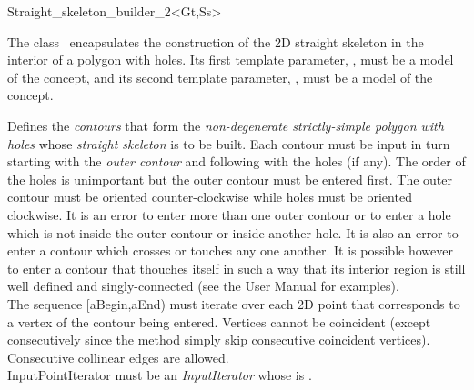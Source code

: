 

\begin{ccRefClass}{Straight_skeleton_builder_2<Gt,Ss>}

\ccDefinition
The class \ccRefName\  encapsulates the construction of the 2D straight skeleton in the interior of a polygon with holes. Its first template parameter, , must be a model of the  concept, and its second template parameter, , must be a model of the  concept.
 
\ccTypes
\ccGlue
\ccGlue

\ccCreation
{}


{Defines the \textit{contours} that form the \textit{non-degenerate strictly-simple polygon with holes} whose \textit{straight skeleton} is to be built. Each contour must be input in turn starting with the \textit{outer contour} and following with the holes (if any). The order of the holes is unimportant but the outer contour must be entered first. The outer contour must be oriented counter-clockwise while holes must be oriented clockwise. It is an error to enter more than one outer contour or to enter a hole which is not inside the outer contour or inside another hole. It is also an error to enter a contour which crosses or touches any one another. It is possible however to enter a contour that thouches itself in such a way that its interior region is still well defined and singly-connected (see the User Manual for examples).\\
The sequence [aBegin,aEnd) must iterate over each 2D point that corresponds to a vertex of the contour being entered. Vertices cannot be coincident (except consecutively since the method simply skip consecutive coincident vertices). Consecutive collinear edges are allowed.\\
InputPointIterator must be an \textit{InputIterator} whose  is .}
   

\end{ccRefClass}
